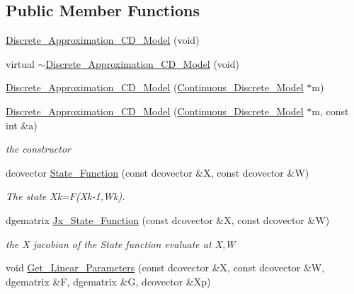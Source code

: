 \subsection*{Public Member Functions}
\begin{CompactItemize}
\item 
\hyperlink{class_discrete___approximation___c_d___model_89b9e3ef2887e000f1129eeef7038e6e}{Discrete\_\-Approximation\_\-CD\_\-Model} (void)
\item 
virtual \hyperlink{class_discrete___approximation___c_d___model_a9d8092144619d8a6a425662da7b29f8}{$\sim$Discrete\_\-Approximation\_\-CD\_\-Model} (void)
\item 
\hyperlink{class_discrete___approximation___c_d___model_36d4695074dc346ac6cba512a436012d}{Discrete\_\-Approximation\_\-CD\_\-Model} (\hyperlink{class_continuous___discrete___model}{Continuous\_\-Discrete\_\-Model} $\ast$m)
\item 
\hyperlink{class_discrete___approximation___c_d___model_564a37759c294b73299bbcb9f29897d1}{Discrete\_\-Approximation\_\-CD\_\-Model} (\hyperlink{class_continuous___discrete___model}{Continuous\_\-Discrete\_\-Model} $\ast$m, const int \&a)
\begin{CompactList}\small\item\em the constructor \item\end{CompactList}\item 
dcovector \hyperlink{class_discrete___approximation___c_d___model_83ef21b9993bfbef655874ca38777131}{State\_\-Function} (const dcovector \&X, const dcovector \&W)
\begin{CompactList}\small\item\em The state Xk=F(Xk-1,Wk). \item\end{CompactList}\item 
dgematrix \hyperlink{class_discrete___approximation___c_d___model_b0ba3cda373913f6a1df4a417200218a}{Jx\_\-State\_\-Function} (const dcovector \&X, const dcovector \&W)
\begin{CompactList}\small\item\em the X jacobian of the State function evaluate at X,W \item\end{CompactList}\item 
void \hyperlink{class_discrete___approximation___c_d___model_445e1215275e1f77f6260a186e9f842a}{Get\_\-Linear\_\-Parameters} (const dcovector \&X, const dcovector \&W, dgematrix \&F, dgematrix \&G, dcovector \&Xp)

\end{CompactItemize}
